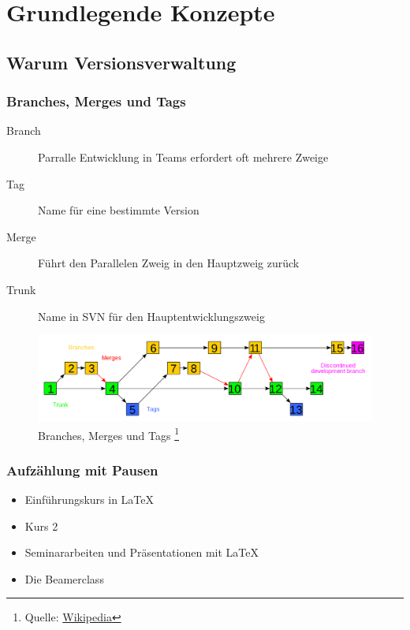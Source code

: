 \documentclass{beamer}
\begin{document}
\section{Grundlegende Konzepte} 
\subsection{Warum Versionsverwaltung}
\begin{frame}\frametitle{Branches, Merges und Tags}
\begin{description}
\item[Branch] Parralle Entwicklung in Teams erfordert oft mehrere Zweige
\item[Tag] Name für eine bestimmte Version 
\item[Merge] Führt den Parallelen Zweig in den Hauptzweig zurück
\item[Trunk] Name in SVN für den Hauptentwicklungszweig
\end{description}

\begin{figure}
\includegraphics[scale=0.15]{2000px-Subversion_project_visualization} 
\caption{Branches, Merges und Tags \footnote{Quelle: \href{http://en.wikipedia.org/wiki/File:Subversion_project_visualization.svg}{Wikipedia}}}
\end{figure}


\end{frame}

\begin{frame}\frametitle{Aufz\"ahlung mit Pausen}
\begin{itemize}
\item  Einf\"uhrungskurs in \LaTeX \pause 
\item  Kurs 2 \pause 
\item  Seminararbeiten und Pr\"asentationen mit \LaTeX \pause 
\item  Die Beamerclass
\end{itemize} 
\end{frame}
\end{document}
